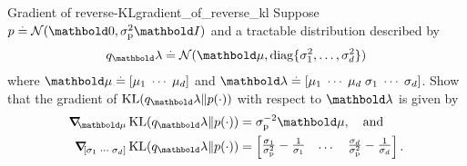 \begin{nexercise}{Gradient of reverse-KL}{gradient_of_reverse_kl}
  Suppose $p \defeq \N{\vzero}{\sigmap^2 \mI}$ and a tractable distribution described by \begin{align*}
    q_\vlambda \defeq \N{\vmu}{\diag{\sigma_1^2, \dots, \sigma_d^2}}
  \end{align*} where $\vmu \defeq [\mu_1 \; \cdots \; \mu_d]$ and $\vlambda \defeq [\mu_1 \; \cdots \; \mu_d \; \sigma_1 \; \cdots \; \sigma_d]$.
  Show that the gradient of $\KL{q_\vlambda}{p(\cdot)}$ with respect to $\vlambda$ is given by \begin{subequations}\begin{align}
    \grad_\vmu \KL{q_\vlambda}{p(\cdot)} &= \sigmap^{-2} \vmu, \quad\text{and} \\
    \grad_{[\sigma_1 \; \cdots \; \sigma_d]} \KL{q_\vlambda}{p(\cdot)} &= \begin{bmatrix}
      \frac{\sigma_1}{\sigmap^2} - \frac{1}{\sigma_1} & \dots & \frac{\sigma_d}{\sigmap^2} - \frac{1}{\sigma_d}
    \end{bmatrix}.
  \end{align}\end{subequations}
\end{nexercise}

